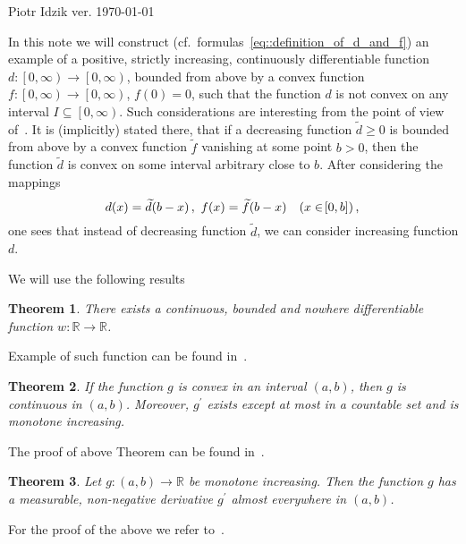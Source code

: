 \documentclass[12pt]{article}
\newcommand{\R}{\mathbb{R}}
\renewcommand{\geq}{\geqslant}
\newcommand{\paren}[1]{\! \left(#1 \right)}
\newcommand{\bracket}[1]{\! \left[#1 \right]}
\theoremstyle{plain}
\newtheorem{theorem}{Theorem}
\theoremstyle{definition}
\theoremstyle{remark}
\begin{document}
\noindent Piotr Idzik \hfill ver. \today\ \currenttime{}

\vspace*{1cm}
In this note we will construct (cf.\ formulas~\eqref{eq::definition_of_d_and_f}) an example of
a positive, strictly increasing, continuously differentiable function $d \colon \left[0, \infty \right) \to \left[0, \infty \right)$,
bounded from above by a convex function $f\colon\left[0, \infty \right) \to \left[0, \infty \right)$, $f\paren{0} = 0$,
such that the function $d$ is not convex on any interval $I \subseteq \left[0, \infty \right)$.
Such considerations are interesting from the point of view of~\cite[p. 167]{Levandosky1998}.
It is (implicitly) stated there, that if a decreasing function
$\widetilde{d} \geq 0$ is bounded from above by a convex function $\widetilde{f}$
vanishing at some point $b > 0$,
then the function $\widetilde{d}$ is convex on some interval arbitrary close to $b$.
After considering the mappings
\begin{equation*}
    d\paren{x} =  \widetilde{d}\paren{b-x}, \ f\paren{x} =  \widetilde{f}\paren{b-x} \quad \paren{x \in \bracket{0, b}}, \\
\end{equation*}
one sees that instead of decreasing function $\widetilde{d}$, we can consider increasing function $d$. 

We will use the following results
\begin{theorem}
    There exists a continuous, bounded and nowhere differentiable function $w \colon \R \to \R$.
\end{theorem}
Example of such function can be found in~\cite[Example 8, p. 38]{gelbaum1964counterexamples}.
 
\begin{theorem} \label{thm::convex_monotone_der}
    If the function $g$ is convex in an interval $\paren{a, b}$, then $g$ is continuous in $\paren{a, b}$.
    Moreover, $g^\prime$ exists except at most in a countable set and is monotone increasing.
\end{theorem}
The proof of above Theorem can be found in~\cite[Theorem 7.40, p. 120]{wheeden1977measure}.

\begin{theorem} \label{thm::monotone_diff_ae}
    Let $g \colon \paren{a, b} \to \R$ be monotone increasing.
    Then the function $g$ has a measurable, non-negative derivative $g^\prime$ almost everywhere in $\paren{a, b}$.
\end{theorem}
For the proof of the above we refer to~\cite[Theorem 7.21, page 111]{wheeden1977measure}.
\end{document}
